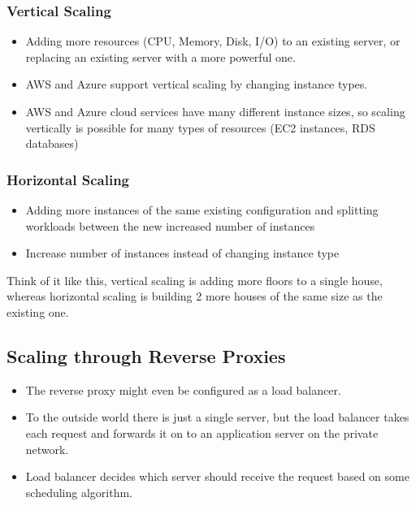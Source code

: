 \documentclass{article}
\begin{document}
\subsubsection{Vertical Scaling}
\begin{itemize}
    \item Adding more resources (CPU, Memory, Disk, I/O) to an existing server, or replacing an existing server with a more powerful one. 
    
    \item AWS and Azure support vertical scaling by changing instance types. 
    
    \item AWS and Azure cloud services have many different instance sizes, so scaling vertically is possible for many types of resources (EC2 instances, RDS databases)
\end{itemize}
\subsubsection{Horizontal Scaling}
\begin{itemize}
    \item Adding more instances of the same existing configuration and splitting workloads between the new increased number of instances
    
    \item Increase number of instances instead of changing instance type
\end{itemize}
Think of it like this, vertical scaling is adding more floors to a single house, whereas horizontal scaling is building 2 more houses of the same size as the existing one. 

\subsection{Scaling through Reverse Proxies}
\begin{itemize}
    \item The reverse proxy might even be configured as a load balancer.
    
    \item To the outside world there is just a single server, but the load balancer takes each request and forwards it on to an application server on the private network.
    
    \item Load balancer decides which server should receive the request based on some scheduling algorithm. 
\end{itemize}
\end{document}
